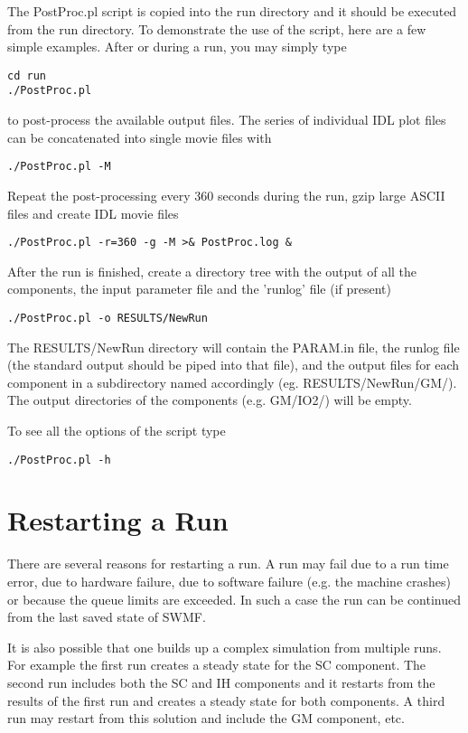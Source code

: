 The PostProc.pl script is copied into the run directory and it should
be executed from the run directory.
To demonstrate the use of the script, here are a few simple examples.
After or during a run, you may simply type
\begin{verbatim}
cd run
./PostProc.pl
\end{verbatim}
to post-process the available output files. The series of individual 
IDL plot files can be concatenated into single movie files with
\begin{verbatim}
./PostProc.pl -M
\end{verbatim}
Repeat the post-processing every 360 seconds during the run,
gzip large ASCII files and create IDL movie files
\begin{verbatim}
./PostProc.pl -r=360 -g -M >& PostProc.log &
\end{verbatim}
After the run is finished, create a directory tree with the output
of all the components, the input parameter file and the 'runlog' file
(if present)
\begin{verbatim}
./PostProc.pl -o RESULTS/NewRun
\end{verbatim}
The RESULTS/NewRun directory will contain the PARAM.in file, the
runlog file (the standard output should be piped into that file),
and the output files for each component in a subdirectory named
accordingly (eg. RESULTS/NewRun/GM/). The output directories of
the components (e.g. GM/IO2/) will be empty.

To see all the options of the script type
\begin{verbatim}
./PostProc.pl -h
\end{verbatim}

\section{Restarting a Run}

There are several reasons for restarting a run. A run may fail
due to a run time error, due to hardware failure, due to 
software failure (e.g. the machine crashes) or because the
queue limits are exceeded. In such a case the run can be continued from
the last saved state of SWMF. 

It is also possible that one builds up a complex simulation from multiple 
runs. For example the first run creates a steady state for the SC component.
The second run includes both the SC and IH components and it 
restarts from the results of the first run and creates a steady state
for both components. A third run may restart from this solution and include
the GM component, etc. 

